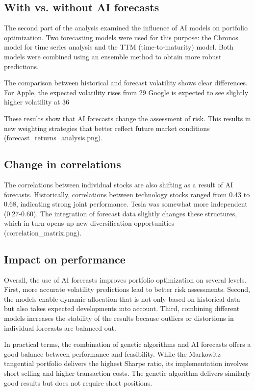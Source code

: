 \documentclass{agasthesis}
\begin{document}
\subsection{With vs. without AI forecasts}
The second part of the analysis examined the influence of AI models on portfolio optimization. Two forecasting models were used for this purpose: 
the Chronos model for time series analysis and the TTM (time-to-maturity) model. Both models were combined using an ensemble method to obtain more robust predictions.

The comparison between historical and forecast volatility shows clear differences. For Apple, the expected volatility rises from 29%
Google is expected to see slightly higher volatility at 36%

These results show that AI forecasts change the assessment of risk. This results in new weighting strategies that better reflect future market conditions (forecast_returns_analysis.png).

\subsection{Change in correlations}
The correlations between individual stocks are also shifting as a result of AI forecasts. Historically, correlations between technology stocks ranged from 0.43 to 0.68, 
indicating strong joint performance. Tesla was somewhat more independent (0.27-0.60). The integration of forecast data slightly changes these structures, which in turn opens up 
new diversification opportunities (correlation_matrix.png).
\subsection{Impact on performance}
Overall, the use of AI forecasts improves portfolio optimization on several levels. First, more accurate volatility predictions lead to better risk assessments. 
Second, the models enable dynamic allocation that is not only based on historical data but also takes expected developments into account. Third, combining different 
models increases the stability of the results because outliers or distortions in individual forecasts are balanced out.

In practical terms, the combination of genetic algorithms and AI forecasts offers a good balance between performance and feasibility. While the Markowitz tangential portfolio 
delivers the highest Sharpe ratio, its implementation involves short selling and higher transaction costs. The genetic algorithm delivers similarly good results but does not require short positions.
\end{document}
